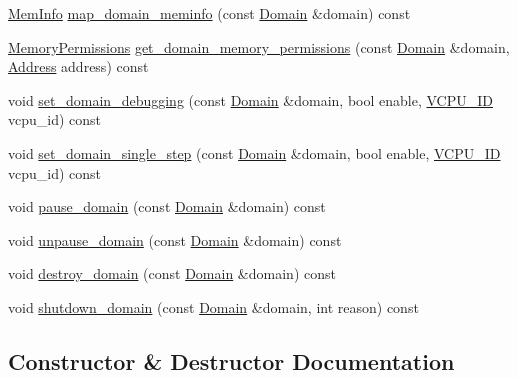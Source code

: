 \begin{DoxyCompactItemize}
\item 
\mbox{\hyperlink{namespacexd_1_1xen_a34ff770013f1c25915f83aac337f2334}{Mem\+Info}} \mbox{\hyperlink{classxd_1_1xen_1_1_xen_ctrl_ab79568724d8e81ead5969fb14f458997}{map\+\_\+domain\+\_\+meminfo}} (const \mbox{\hyperlink{classxd_1_1xen_1_1_domain}{Domain}} \&domain) const
\item 
\mbox{\hyperlink{structxd_1_1xen_1_1_memory_permissions}{Memory\+Permissions}} \mbox{\hyperlink{classxd_1_1xen_1_1_xen_ctrl_aee83c5ad4a65baab09eae0898e1a0658}{get\+\_\+domain\+\_\+memory\+\_\+permissions}} (const \mbox{\hyperlink{classxd_1_1xen_1_1_domain}{Domain}} \&domain, \mbox{\hyperlink{namespacexd_1_1xen_a94a8d6c9448e8330c771c100dba152c3}{Address}} address) const
\item 
void \mbox{\hyperlink{classxd_1_1xen_1_1_xen_ctrl_a5f083d9e0d075d8f31caf9fe1a54639d}{set\+\_\+domain\+\_\+debugging}} (const \mbox{\hyperlink{classxd_1_1xen_1_1_domain}{Domain}} \&domain, bool enable, \mbox{\hyperlink{namespacexd_1_1xen_ac71045dda8a7d9d6fd0d7643001bb14e}{V\+C\+P\+U\+\_\+\+ID}} vcpu\+\_\+id) const
\item 
void \mbox{\hyperlink{classxd_1_1xen_1_1_xen_ctrl_ab1df8547401e88fbf5bc9ce01889214a}{set\+\_\+domain\+\_\+single\+\_\+step}} (const \mbox{\hyperlink{classxd_1_1xen_1_1_domain}{Domain}} \&domain, bool enable, \mbox{\hyperlink{namespacexd_1_1xen_ac71045dda8a7d9d6fd0d7643001bb14e}{V\+C\+P\+U\+\_\+\+ID}} vcpu\+\_\+id) const
\item 
void \mbox{\hyperlink{classxd_1_1xen_1_1_xen_ctrl_a958c3a8fd4c1e65a3cc274b42e31c768}{pause\+\_\+domain}} (const \mbox{\hyperlink{classxd_1_1xen_1_1_domain}{Domain}} \&domain) const
\item 
void \mbox{\hyperlink{classxd_1_1xen_1_1_xen_ctrl_a03d0163103225ba51055560b953a407b}{unpause\+\_\+domain}} (const \mbox{\hyperlink{classxd_1_1xen_1_1_domain}{Domain}} \&domain) const
\item 
void \mbox{\hyperlink{classxd_1_1xen_1_1_xen_ctrl_a68c5778543f8d8e9ca0e8f4a1f7535a7}{destroy\+\_\+domain}} (const \mbox{\hyperlink{classxd_1_1xen_1_1_domain}{Domain}} \&domain) const
\item 
void \mbox{\hyperlink{classxd_1_1xen_1_1_xen_ctrl_a687dbe8f330e23c8b36b540733989626}{shutdown\+\_\+domain}} (const \mbox{\hyperlink{classxd_1_1xen_1_1_domain}{Domain}} \&domain, int reason) const
\end{DoxyCompactItemize}


\subsection{Constructor \& Destructor Documentation}
\mbox{\label{classxd_1_1xen_1_1_xen_ctrl_a53b6326e432b0b19bad0e06d408135f7}} 
